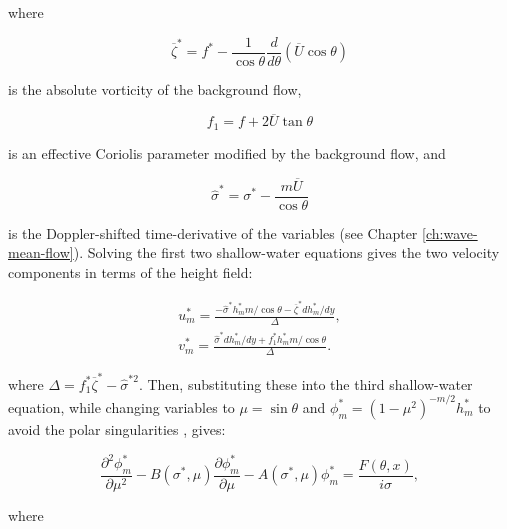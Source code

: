  where

 \begin{equation}
     \overline{\zeta}^{*} = f^{*} - \frac{1}{\cos \theta} \frac{d}{d \theta}(\overline{U} \cos \theta)
 \end{equation}

 is the absolute vorticity of the background flow,

 \begin{equation}
     f_{1} = f + 2 \overline{U} \tan \theta
 \end{equation}

 is an effective Coriolis parameter modified by the background flow, and

 \begin{equation}
     \hat{\sigma}^{*}  =  \sigma^{*} - \frac{m \overline{U}}{\cos \theta}
 \end{equation}

 is the Doppler-shifted time-derivative of the variables (see Chapter \ref{ch:wave-mean-flow}). Solving the first two shallow-water equations gives the two velocity components in terms of the height field:

 \begin{equation}
   \begin{aligned}
     u_{m}^{*} = \frac{- \hat{\sigma}^{*}h_{m}^{*} m/\cos \theta - \overline{\zeta}^{*} d h_{m}^{*} / d y}{\Delta},\\
     v_{m}^{*} = \frac{\hat{\sigma}^{*} d h_{m}^{*} / d y + f_{1}^{*} h_{m}^{*} m / \cos \theta }{\Delta}.
   \end{aligned}
 \end{equation}

 where $\Delta = f_{1}^{*} \overline{\zeta}^{*} - \hat{\sigma}^{*2}$. Then, substituting these into the third shallow-water equation, while changing variables to $\mu = \sin \theta$ and $\phi_{m}^{*} = \left(1-\mu^{2}\right)^{-m / 2} h_{m}^{*}$ to avoid the polar singularities \citep{iga2005spherical}, gives:


 \begin{equation}
   \frac{\partial^{2} \phi_{m}^{*}}{\partial \mu^{2}}-B\left(\sigma^{*}, \mu\right) \frac{\partial \phi_{m}^{*}}{\partial \mu}-A\left(\sigma^{*}, \mu\right) \phi_{m}^{*}=\frac{F(\theta,x)}{i \sigma},
 \end{equation}

 where

